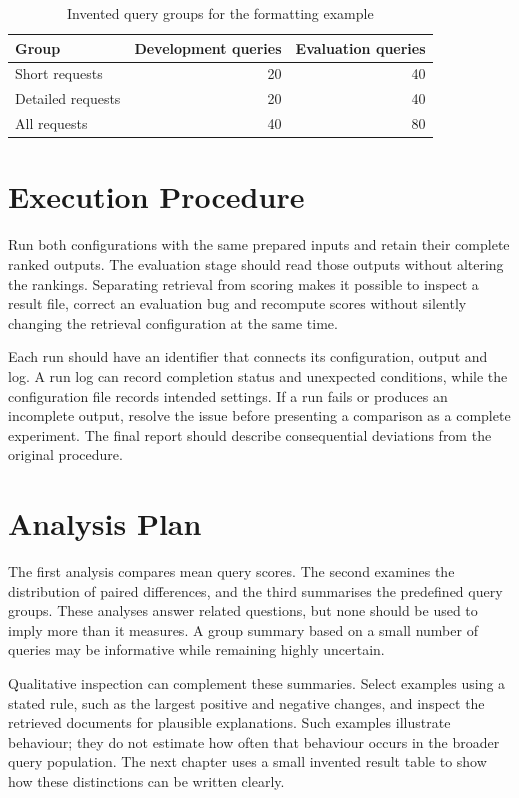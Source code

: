 \begin{table}[htbp]
  \centering
  \caption{Invented query groups for the formatting example}
  \label{tab:datasets}
  \begin{tabular}{lrr}\hline
    Group & Development queries & Evaluation queries\\\hline
    Short requests & 20 & 40\\
    Detailed requests & 20 & 40\\
    All requests & 40 & 80\\\hline
  \end{tabular}
\end{table}

\clearpage
\section{Execution Procedure}
Run both configurations with the same prepared inputs and retain their complete
ranked outputs. The evaluation stage should read those outputs without altering
the rankings. Separating retrieval from scoring makes it possible to inspect
a result file, correct an evaluation bug and recompute scores without silently
changing the retrieval configuration at the same time.

Each run should have an identifier that connects its configuration, output and
log. A run log can record completion status and unexpected conditions, while
the configuration file records intended settings. If a run fails or produces
an incomplete output, resolve the issue before presenting a comparison as a
complete experiment. The final report should describe consequential deviations
from the original procedure.

\section{Analysis Plan}
The first analysis compares mean query scores. The second examines the
distribution of paired differences, and the third summarises the predefined
query groups. These analyses answer related questions, but none should be used
to imply more than it measures. A group summary based on a small number of
queries may be informative while remaining highly uncertain.

Qualitative inspection can complement these summaries. Select examples using
a stated rule, such as the largest positive and negative changes, and inspect
the retrieved documents for plausible explanations. Such examples illustrate
behaviour; they do not estimate how often that behaviour occurs in the broader
query population. The next chapter uses a small invented result table to
show how these distinctions can be written clearly.
